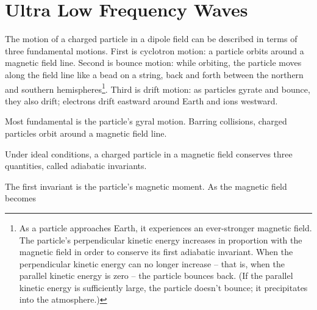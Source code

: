 
\chapter{Ultra Low Frequency Waves}
  \label{ch_waves}

The motion of a charged particle in a dipole field can be described in terms of three fundamental motions. First is cyclotron motion: a particle orbits around a magnetic field line. Second is bounce motion: while orbiting, the particle moves along the field line like a bead on a string, back and forth between the northern and southern hemispheres\footnote{As a particle approaches Earth, it experiences an ever-stronger magnetic field. The particle's perpendicular kinetic energy increases in proportion with the magnetic field in order to conserve its first adiabatic invariant. When the perpendicular kinetic energy can no longer increase -- that is, when the parallel kinetic energy is zero -- the particle bounces back. (If the parallel kinetic energy is sufficiently large, the particle doesn't bounce; it precipitates into the atmosphere.)}. Third is drift motion: as particles gyrate and bounce, they also drift; electrons drift eastward around Earth and ions westward. 







Most fundamental is the particle's gyral motion. Barring collisions, charged particles orbit around a magnetic field line. 

Under ideal conditions, a charged particle in a magnetic field conserves three quantities, called adiabatic invariants. 


The first invariant is the particle's magnetic moment. As the magnetic field becomes 













